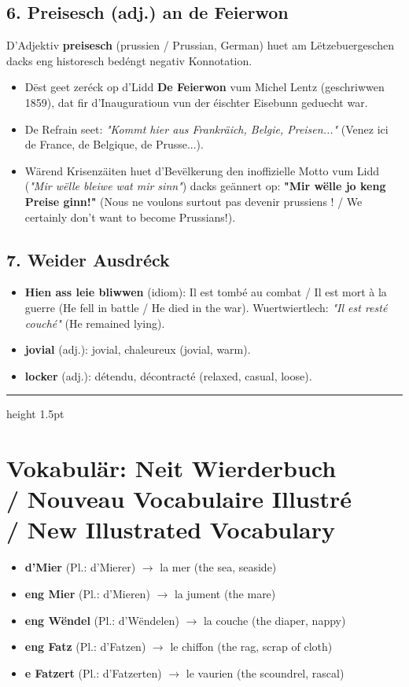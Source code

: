 \subsection*{6. Preisesch (adj.) an de Feierwon}
D'Adjektiv \textbf{preisesch} (prussien / Prussian, German) huet am Lëtzebuergeschen dacks eng historesch bedéngt negativ Konnotation.
\begin{itemize}
    \item Dëst geet zeréck op d'Lidd \textbf{De Feierwon} vum Michel Lentz (geschriwwen 1859), dat fir d'Inauguratioun vun der éischter Eisebunn geduecht war.
    \item De Refrain seet: \textit{"Kommt hier aus Frankräich, Belgie, Preisen..."} (Venez ici de France, de Belgique, de Prusse...).
    \item Wärend Krisenzäiten huet d'Bevëlkerung den inoffizielle Motto vum Lidd (\textit{"Mir wëlle bleiwe wat mir sinn"}) dacks geännert op: \textbf{"Mir wëlle jo keng Preise ginn!"} (Nous ne voulons surtout pas devenir prussiens ! / We certainly don't want to become Prussians!).
\end{itemize}

\subsection*{7. Weider Ausdréck}
\begin{itemize}
    \item \textbf{Hien ass leie bliwwen} (idiom): Il est tombé au combat / Il est mort à la guerre (He fell in battle / He died in the war). Wuertwiertlech: \textit{"Il est resté couché"} (He remained lying).
    \item \textbf{jovial} (adj.): jovial, chaleureux (jovial, warm).
    \item \textbf{locker} (adj.): détendu, décontracté (relaxed, casual, loose).
\end{itemize}

\vspace{1.5cm}
\color{geminiBlue}\hrule height 1.5pt \vspace{0.5em}\color{black}
\section[Vokabulär: Neit Wierderbuch]{Vokabulär: Neit Wierderbuch \\/ Nouveau Vocabulaire Illustré \\/ New Illustrated Vocabulary}

\begin{itemize}
    \item \textbf{d'Mier} (Pl.: d'Mierer) $\rightarrow$ la mer (the sea, seaside)
    \item \textbf{eng Mier} (Pl.: d'Mieren) $\rightarrow$ la jument (the mare)
    \item \textbf{eng Wëndel} (Pl.: d'Wëndelen) $\rightarrow$ la couche (the diaper, nappy)
    \item \textbf{eng Fatz} (Pl.: d'Fatzen) $\rightarrow$ le chiffon (the rag, scrap of cloth)
    \item \textbf{e Fatzert} (Pl.: d'Fatzerten) $\rightarrow$ le vaurien (the scoundrel, rascal)
\end{itemize}

